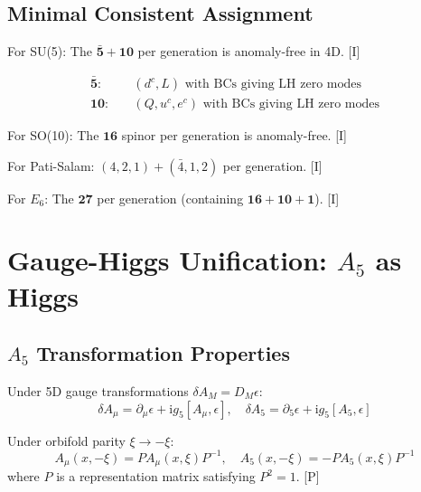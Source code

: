 \documentclass[11pt,a4paper]{article}
\newcommand{\ii}{\mathrm{i}}
\begin{document}
\subsection{Minimal Consistent Assignment}

For SU(5): The $\mathbf{\bar{5}} + \mathbf{10}$ per generation is anomaly-free in 4D. [I]

\begin{equation}
\begin{aligned}
\mathbf{\bar{5}}: &\quad (d^c, L) \text{ with BCs giving LH zero modes} \\
\mathbf{10}: &\quad (Q, u^c, e^c) \text{ with BCs giving LH zero modes}
\end{aligned}
\label{eq:su5-assignment}
\end{equation}

For SO(10): The $\mathbf{16}$ spinor per generation is anomaly-free. [I]

For Pati-Salam: $(4, 2, 1) + (\bar{4}, 1, 2)$ per generation. [I]

For $E_6$: The $\mathbf{27}$ per generation (containing $\mathbf{16} + \mathbf{10} + \mathbf{1}$). [I]

\section{Gauge-Higgs Unification: $A_5$ as Higgs}
\label{sec:gauge-higgs}

\subsection{$A_5$ Transformation Properties}

Under 5D gauge transformations $\delta A_M = D_M \epsilon$:
\begin{equation}
\delta A_\mu = \partial_\mu \epsilon + \ii g_5 [A_\mu, \epsilon], \quad
\delta A_5 = \partial_5 \epsilon + \ii g_5 [A_5, \epsilon]
\label{eq:gauge-transform}
\end{equation}

Under orbifold parity $\xi \to -\xi$:
\begin{equation}
A_\mu(x, -\xi) = P A_\mu(x, \xi) P^{-1}, \quad
A_5(x, -\xi) = -P A_5(x, \xi) P^{-1}
\label{eq:a5-parity}
\end{equation}
where $P$ is a representation matrix satisfying $P^2 = 1$. [P]
\end{document}
